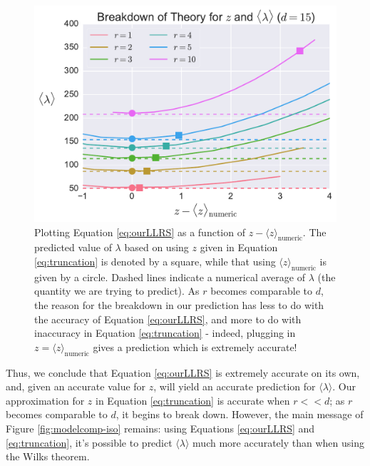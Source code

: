 \documentclass[aps,pra, twocolumn]{revtex4-1}
\begin{document}
\begin{figure}[h]
 \includegraphics[width=\columnwidth]{Images/Figure_temp3.pdf}
 \caption{Plotting Equation \eqref{eq:ourLLRS} as a function of $z-\langle z \rangle_{\mathrm{numeric}}$. The predicted value of $\lambda$ based on using $z$ given in Equation \eqref{eq:truncation} is denoted by a square, while that using $\langle z \rangle_{\mathrm{numeric}}$ is given by a circle. Dashed lines indicate a numerical average of $\lambda$ (the quantity we are trying to predict). As $r$ becomes comparable to $d$, the reason for the breakdown in our prediction has less to do with the accuracy of Equation \eqref{eq:ourLLRS}, and more to do with inaccuracy in Equation \eqref{eq:truncation} - indeed, plugging in $z = \langle z \rangle_{\mathrm{numeric}}$ gives a prediction which is extremely accurate!}
 \label{fig:comparez}
\end{figure}

Thus, we conclude that Equation \eqref{eq:ourLLRS} is extremely accurate on its own, and, given an accurate value for $z$, will yield an accurate prediction for $\langle \lambda \rangle$. Our approximation for $z$ in Equation \eqref{eq:truncation} is accurate when $r << d$; as $r$ becomes comparable to $d$, it begins to break down. However, the main message of Figure \ref{fig:modelcomp-iso} remains: using Equations \eqref{eq:ourLLRS} and \eqref{eq:truncation}, it's possible to predict $\langle \lambda \rangle$ much more accurately than when using the Wilks theorem. 
\end{document}
